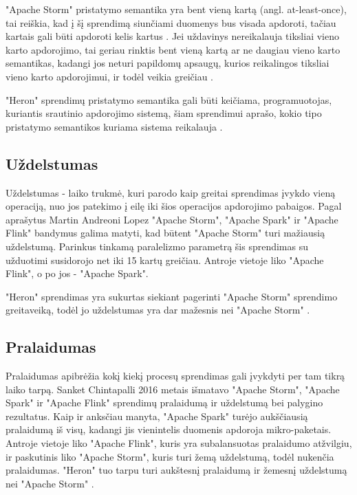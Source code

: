 \documentclass{VUMIFPSbakalaurinis}
\begin{document}
"Apache Storm" pristatymo semantika yra bent vieną kartą (angl. at-least-once), tai reiškia, kad į šį sprendimą siunčiami duomenys bus visada apdoroti, tačiau kartais gali būti apdoroti kelis kartus \cite{prithi20}. Jei uždavinys nereikalauja tiksliai vieno karto apdorojimo, tai geriau rinktis bent vieną kartą ar ne daugiau vieno karto semantikas, kadangi jos neturi papildomų apsaugų, kurios reikalingos tiksliai vieno karto apdorojimui, ir todėl veikia greičiau \cite{zhang20}. \par

"Heron" sprendimų pristatymo semantika gali būti keičiama, programuotojas, kuriantis srautinio apdorojimo sistemą, šiam sprendimui aprašo, kokio tipo pristatymo semantikos kuriama sistema reikalauja \cite{delivery-semantics}.

\subsection{Uždelstumas}

Uždelstumas - laiko trukmė, kuri parodo kaip greitai sprendimas įvykdo vieną operaciją, nuo jos patekimo į eilę iki šios operacijos apdorojimo pabaigos. Pagal \cite{Lopez2016APC} aprašytus Martin Andreoni Lopez "Apache Storm", "Apache Spark" ir "Apache Flink" bandymus galima matyti, kad būtent "Apache Storm" turi mažiausią uždelstumą. Parinkus tinkamą paralelizmo parametrą šis sprendimas su užduotimi susidorojo net iki 15 kartų greičiau. Antroje vietoje liko "Apache Flink", o po jos - "Apache Spark". \par

"Heron" sprendimas yra sukurtas siekiant pagerinti "Apache Storm" sprendimo greitaveiką, todėl jo uždelstumas yra dar mažesnis nei "Apache Storm" \cite{Kulkarni:2015:THS:2723372.2742788}.

\subsection{Pralaidumas}

Pralaidumas apibrėžia kokį kiekį procesų sprendimas gali įvykdyti per tam tikrą laiko tarpą. Sanket Chintapalli 2016 metais išmatavo "Apache Storm", "Apache Spark" ir "Apache Flink" sprendimų pralaidumą ir uždelstumą bei palygino rezultatus. Kaip ir anksčiau manyta, "Apache Spark" turėjo aukščiausią pralaidumą iš visų, kadangi jis vienintelis duomenis apdoroja mikro-paketais\cite{chintapalli2016benchmarking}. Antroje vietoje liko "Apache Flink", kuris yra subalansuotas pralaidumo atžvilgiu, ir paskutinis liko "Apache Storm", kuris turi žemą uždelstumą, todėl nukenčia pralaidumas. "Heron" tuo tarpu turi aukštesnį pralaidumą ir žemesnį uždelstumą nei "Apache Storm" \cite{TwitterHeron}. 
\end{document}
